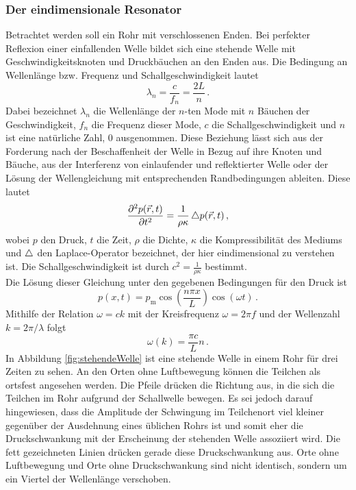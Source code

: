 \subsubsection{Der eindimensionale Resonator}
Betrachtet werden soll ein Rohr mit verschlossenen Enden. Bei perfekter Reflexion einer einfallenden Welle bildet sich eine stehende Welle mit Geschwindigkeitsknoten und Druckbäuchen an den Enden aus. Die Bedingung an Wellenlänge bzw. Frequenz und Schallgeschwindigkeit lautet
\begin{equation}
  \lambda_n = \frac{c}{f_n} = \frac{2L}{n}\,.
  \label{eqn:stehendeWelle}
\end{equation}
Dabei bezeichnet $\lambda_n$ die Wellenlänge der $n$-ten Mode mit $n$ Bäuchen der Geschwindigkeit, $f_n$ die Frequenz dieser Mode, $c$ die Schallgeschwindigkeit und $n$ ist eine natürliche Zahl, 0 ausgenommen.
Diese Beziehung lässt sich aus der Forderung nach der Beschaffenheit der Welle in Bezug auf ihre Knoten und Bäuche, aus der Interferenz von einlaufender und reflektierter Welle oder der Lösung der Wellengleichung mit entsprechenden Randbedingungen ableiten. Diese lautet
\begin{equation}
  \frac{\partial^2 p(\vec{r},t)}{\partial t^2} = \frac{1}{\rho \kappa} \mathop{}\!\mathbin\bigtriangleup p(\vec{r},t)\,,
  \label{eqn:wellengleichung}
\end{equation}
wobei $p$ den Druck, $t$ die Zeit, $\rho$ die Dichte, $\kappa$ die Kompressibilität des Mediums und $\mathop{}\!\mathbin\bigtriangleup$ den Laplace-Operator bezeichnet, der hier eindimensional zu verstehen ist. Die Schallgeschwindigkeit ist durch $c^2 = \frac{1}{\rho \kappa}$ bestimmt.\\
Die Lösung dieser Gleichung unter den gegebenen Bedingungen für den Druck ist
\begin{equation}
  p(x,t) = p_\text{m} \cos\left(\frac{n \pi x}{L}\right) \cos(\omega t)\,.
  \label{eqn:stehendeWelle2}
\end{equation}
Mithilfe der Relation $\omega = ck$ mit der Kreisfrequenz $\omega = 2 \pi f$ und der Wellenzahl $k = 2 \pi / \lambda$ folgt
\begin{equation}
  \omega(k) = \frac{\pi c}{L} n\,.
  \label{eqn:dispersionKlassisch}
\end{equation}
In Abbildung \ref{fig:stehendeWelle} ist eine stehende Welle in einem Rohr für drei Zeiten zu sehen. An den Orten ohne Luftbewegung können die Teilchen als ortsfest angesehen werden. Die Pfeile drücken die Richtung aus, in die sich die Teilchen im Rohr aufgrund der Schallwelle bewegen. Es sei jedoch darauf hingewiesen, dass die Amplitude der Schwingung im Teilchenort viel kleiner gegenüber der Ausdehnung eines üblichen Rohrs ist und somit eher die Druckschwankung mit der Erscheinung der stehenden Welle assoziiert wird. Die fett gezeichneten Linien drücken gerade diese Druckschwankung aus. Orte ohne Luftbewegung und Orte ohne Druckschwankung sind nicht identisch, sondern um ein Viertel der Wellenlänge verschoben.

